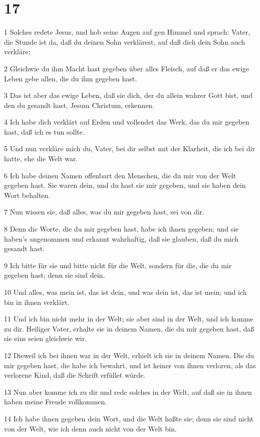 \chapter{17}

\par 1 Solches redete Jesus, und hob seine Augen auf gen Himmel und sprach: Vater, die Stunde ist da, daß du deinen Sohn verklärest, auf daß dich dein Sohn auch verkläre;
\par 2 Gleichwie du ihm Macht hast gegeben über alles Fleisch, auf daß er das ewige Leben gebe allen, die du ihm gegeben hast.
\par 3 Das ist aber das ewige Leben, daß sie dich, der du allein wahrer Gott bist, und den du gesandt hast, Jesum Christum, erkennen.
\par 4 Ich habe dich verklärt auf Erden und vollendet das Werk, das du mir gegeben hast, daß ich es tun sollte.
\par 5 Und nun verkläre mich du, Vater, bei dir selbst mit der Klarheit, die ich bei dir hatte, ehe die Welt war.
\par 6 Ich habe deinen Namen offenbart den Menschen, die du mir von der Welt gegeben hast. Sie waren dein, und du hast sie mir gegeben, und sie haben dein Wort behalten.
\par 7 Nun wissen sie, daß alles, was du mir gegeben hast, sei von dir.
\par 8 Denn die Worte, die du mir gegeben hast, habe ich ihnen gegeben; und sie haben's angenommen und erkannt wahrhaftig, daß sie glauben, daß du mich gesandt hast.
\par 9 Ich bitte für sie und bitte nicht für die Welt, sondern für die, die du mir gegeben hast; denn sie sind dein.
\par 10 Und alles, was mein ist, das ist dein, und was dein ist, das ist mein; und ich bin in ihnen verklärt.
\par 11 Und ich bin nicht mehr in der Welt; sie aber sind in der Welt, und ich komme zu dir. Heiliger Vater, erhalte sie in deinem Namen, die du mir gegeben hast, daß sie eins seien gleichwie wir.
\par 12 Dieweil ich bei ihnen war in der Welt, erhielt ich sie in deinem Namen. Die du mir gegeben hast, die habe ich bewahrt, und ist keiner von ihnen verloren, als das verlorene Kind, daß die Schrift erfüllet würde.
\par 13 Nun aber komme ich zu dir und rede solches in der Welt, auf daß sie in ihnen haben meine Freude vollkommen.
\par 14 Ich habe ihnen gegeben dein Wort, und die Welt haßte sie; denn sie sind nicht von der Welt, wie ich denn auch nicht von der Welt bin.
